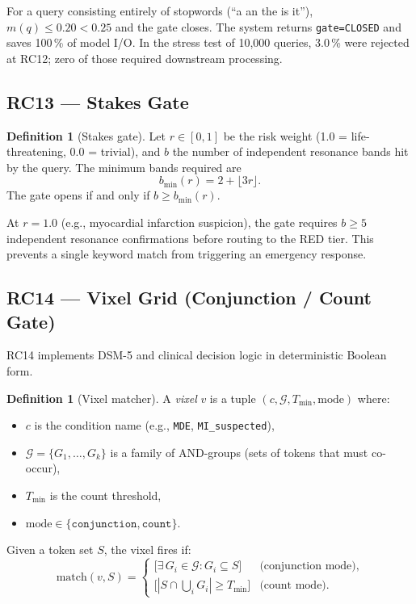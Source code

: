 \documentclass[12pt,a4paper]{article}
\theoremstyle{plain}
\theoremstyle{definition}
\newtheorem{definition}[theorem]{Definition}
\theoremstyle{remark}
\begin{document}
For a query consisting entirely of stopwords (``a an the is it''),
$m(q) \leq 0.20 < 0.25$ and the gate closes.
The system returns \texttt{gate=CLOSED} and saves 100\,\% of model I/O.
In the stress test of 10{,}000 queries, 3.0\,\% were rejected at RC12;
zero of those required downstream processing.

\subsection{RC13 --- Stakes Gate}
\label{sec:rc13}

\begin{definition}[Stakes gate]
Let $r \in [0,1]$ be the risk weight (1.0 = life-threatening, 0.0 =
trivial), and $b$ the number of independent resonance bands hit by
the query.  The minimum bands required are
\begin{equation}
b_{\min}(r) = 2 + \lfloor 3r \rfloor.
\label{eq:rc13}
\end{equation}
The gate opens if and only if $b \geq b_{\min}(r)$.
\end{definition}

At $r = 1.0$ (e.g., myocardial infarction suspicion), the gate requires
$b \geq 5$ independent resonance confirmations before routing to the
RED tier.  This prevents a single keyword match from triggering an
emergency response.

\subsection{RC14 --- Vixel Grid (Conjunction / Count Gate)}
\label{sec:rc14}

RC14 implements DSM-5 and clinical decision logic in deterministic
Boolean form.

\begin{definition}[Vixel matcher]
A \emph{vixel} $v$ is a tuple $(c, \mathcal{G}, T_{\min}, \text{mode})$
where:
\begin{itemize}[noitemsep]
  \item $c$ is the condition name (e.g., \texttt{MDE}, \texttt{MI\_suspected}),
  \item $\mathcal{G} = \{G_1, \ldots, G_k\}$ is a family of
    AND-groups (sets of tokens that must co-occur),
  \item $T_{\min}$ is the count threshold,
  \item $\text{mode} \in \{\texttt{conjunction}, \texttt{count}\}$.
\end{itemize}
Given a token set $S$, the vixel fires if:
\begin{equation}
\text{match}(v, S) =
\begin{cases}
\bigl[\exists\, G_i \in \mathcal{G} : G_i \subseteq S\bigr]
  & \text{(conjunction mode)}, \\
\bigl[|S \cap \bigcup_i G_i| \geq T_{\min}\bigr]
  & \text{(count mode)}.
\end{cases}
\label{eq:rc14}
\end{equation}
\end{definition}
\end{document}
